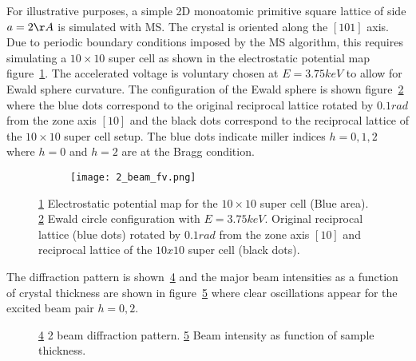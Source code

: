 For illustrative purposes, a simple 2D monoatomic primitive square lattice of side $a=2\AA$ is simulated with MS.
The crystal is oriented along the $[10 1]$ axis. Due to periodic boundary conditions imposed by the MS algorithm, this requires simulating a $10\times10$ super cell as shown in the electrostatic potential map figure~\ref{fig:2_beam_V}.
The accelerated voltage is voluntary chosen at $E=3.75keV$ to allow for  Ewald sphere curvature. The configuration of the Ewald sphere is shown figure~\ref{fig:2_beam_E} where the blue dots correspond to the original reciprocal lattice rotated by $0.1rad$ from the zone axis $[1 0]$ and the black dots correspond to the reciprocal lattice of the $10\times10$ super cell setup. The blue dots indicate miller indices $h=0,1,2$ where $h=0$ and $h=2$ are at the Bragg condition.

\begin{figure}[h!]
	\begin{subfigure}{0.45\textwidth}
		\centering
		\texttt{[image: 2\_beam\_fv.png]}
		\caption{}\label{fig:2_beam_V}
	\end{subfigure}
	\begin{subfigure}{0.45\textwidth}
		\centering
    \def\svgwidth{\columnwidth}
		
		\caption{}\label{fig:2_beam_E}
	\end{subfigure}

	\caption[2-beam configuration]{
		\ref{fig:2_beam_V} Electrostatic potential map for the $10\times10$ super cell (Blue area).
		\ref{fig:2_beam_E} Ewald circle configuration with $E=3.75keV$. Original reciprocal lattice (blue dots) rotated by $0.1rad$ from the zone axis $[1 0]$ and reciprocal lattice of the $10x10$ super cell (black dots).
	}\label{fig:2_beam_config}
\end{figure}


The diffraction pattern is shown~\ref{fig:2_beam_P} and the major beam intensities as a function of crystal thickness are shown in figure~\ref{fig:2_beam_B} where clear oscillations appear for the excited beam pair $h=0,2$.

\begin{figure}[h!]
  \begin{subfigure}{0.45\textwidth}
    \centering
    \def\svgwidth{\columnwidth}
    
    \caption{}\label{fig:2_beam_P}
  \end{subfigure}
  \begin{subfigure}{0.45\textwidth}
    \centering
    \def\svgwidth{\columnwidth}
    
    \caption{}\label{fig:2_beam_B}
  \end{subfigure}
\caption[2-beam diffraction]{
  \ref{fig:2_beam_P} 2 beam diffraction pattern.
  \ref{fig:2_beam_B} Beam intensity as function of sample thickness.
}\label{fig:2_beam_diff}
\end{figure}



